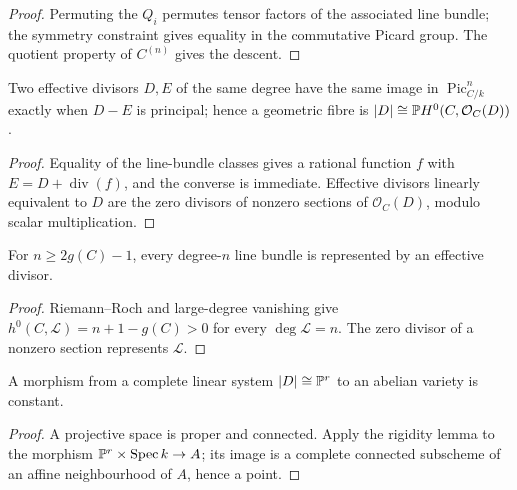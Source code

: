 \begin{proof}
  Permuting the \(Q_i\) permutes tensor factors of the associated line bundle;
  the symmetry constraint gives equality in the commutative Picard group.
  The quotient property of \(C^{(n)}\) gives the descent.
\end{proof}

\begin{lemma}
  \label{mk-lem-abel-fibre-linear-system}
  \cite{milne-av,hartshorne-ag}
  Two effective divisors \(D,E\) of the same degree have the same image in
  \(\operatorname{Pic}^n_{C/k}\) exactly when \(D-E\) is principal; hence a
  geometric fibre is \(|D|\cong\mathbb{P} H^0(C,\mathcal O_C(D))\).
\end{lemma}

\begin{proof}
  Equality of the line-bundle classes gives a rational function
  \(f\) with \(E=D+\operatorname{div}(f)\), and the converse is immediate.
  Effective divisors linearly equivalent to \(D\) are the zero divisors of
  nonzero sections of \(\mathcal O_C(D)\), modulo scalar multiplication.
\end{proof}

\begin{lemma}
  \label{mk-lem-abel-jacobi-surjective}
  \cite{milne-av}
  For \(n\ge2g(C)-1\), every degree-\(n\) line bundle is represented by an
  effective divisor.
\end{lemma}

\begin{proof}
  Riemann--Roch and large-degree vanishing give
  \(h^0(C,\mathcal L)=n+1-g(C)>0\) for every \(\deg\mathcal L=n\).  The zero
  divisor of a nonzero section represents \(\mathcal L\).
\end{proof}

\begin{lemma}
  \label{mk-lem-map-constant-on-linear-system}
  \cite{milne-av}
  A morphism from a complete linear system \(|D|\cong\mathbb{P}^r\) to an abelian
  variety is constant.
\end{lemma}

\begin{proof}
  A projective space is proper and connected.  Apply the rigidity lemma to
  the morphism \(\mathbb{P}^r\times\operatorname{Spec} k\to A\); its image is a complete connected
  subscheme of an affine neighbourhood of \(A\), hence a point.
\end{proof}


